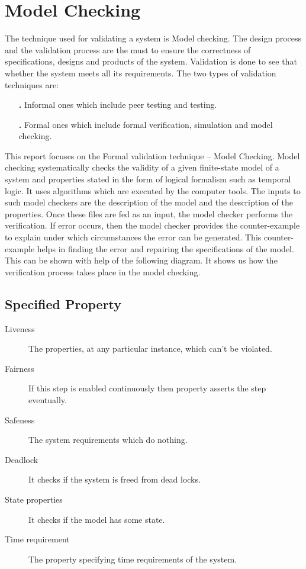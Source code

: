 \documentclass{article}
\begin{document}
\section{Model Checking}
The technique used for validating a system is Model checking. The design process and the validation process are the must to ensure the correctness of specifications, designs and products of the system. Validation is done to see that whether the system meets all its requirements.
The two types of validation techniques are:
\begin{itemize}
\item[\textbf{.}]Informal ones which include peer testing and testing.

\end{itemize}	
\begin{itemize}
\item[\textbf{.}]Formal ones which include formal verification, simulation and model checking.

\end{itemize}	
This report focuses on the Formal validation technique – Model Checking.
Model checking systematically checks the validity of a given finite-state model of a system and properties stated in the form of logical formalism such as temporal logic. It uses algorithms which are executed by the computer tools. The inputs to such model checkers are the description of the model and the description of the properties. Once these files are fed as an input, the model checker performs the verification. If error occurs, then the model checker provides the counter-example to explain under which circumstances the error can be generated. This counter-example helps in finding the error and repairing the specifications of the model. This can be shown with help of the following diagram. It shows us how the verification process takes place in the model checking.

\subsection{Specified Property}
\label{sec:specprop}

\begin{description}
\item[Liveness] The properties, at any particular instance, which can’t be violated.
\item[Fairness] If this step is enabled continuously then property asserts the step eventually.
\item[Safeness] The system requirements which do nothing.
\item[Deadlock] It checks if the system is freed from dead locks.
\item[State properties] It checks if the model has some state.
\item[Time requirement] The property specifying time requirements of the system.
\end{description}
\end{document}
